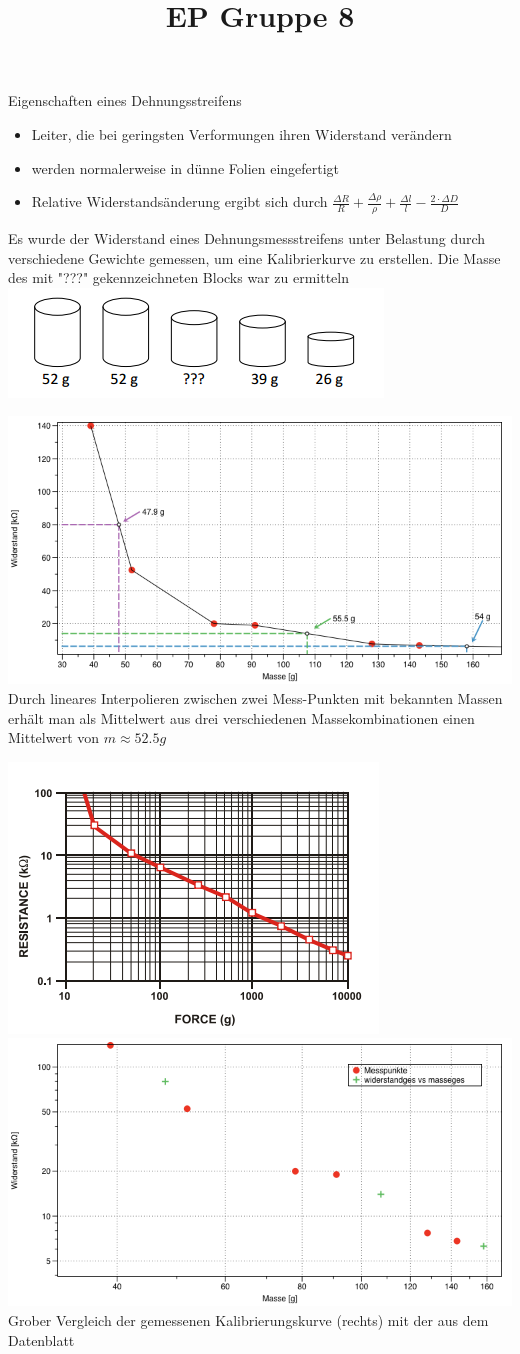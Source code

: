 \documentclass[compress,11pt]{beamer}
\title{EP Gruppe 8}
\begin{document}
\begin{frame}
\begin{block}{Eigenschaften eines Dehnungsstreifens}
\begin{itemize}
\item Leiter, die bei geringsten Verformungen ihren Widerstand verändern
\item werden normalerweise in dünne Folien eingefertigt
\item Relative Widerstandsänderung ergibt sich durch $\frac{\Delta R}{R} + \frac{\Delta \rho}{\rho} + \frac{\Delta l}{l} - \frac{2 \cdot \Delta D}{D}$
\end{itemize}
\end{block}

Es wurde der Widerstand eines Dehnungsmessstreifens unter Belastung durch verschiedene Gewichte gemessen, um eine Kalibrierkurve zu erstellen. Die Masse des mit "???" gekennzeichneten Blocks war zu ermitteln\\
\includegraphics[width=.5\textwidth]{../massen}

\end{frame}
\begin{frame}
\includegraphics[width=.7\textwidth]{../dehnungsstreifen}\\
Durch lineares Interpolieren zwischen zwei Mess-Punkten mit bekannten Massen erhält man als Mittelwert aus drei verschiedenen Massekombinationen einen Mittelwert von $m \approx 52.5 g$
\end{frame}
\begin{frame}
\includegraphics[width=.4\textwidth]{../datenblatt_kurve}
\includegraphics[width=.5\textwidth]{../dehnungsstreifenlog}\\
Grober Vergleich der gemessenen Kalibrierungskurve (rechts) mit der aus dem Datenblatt
\end{frame}
\end{document}
